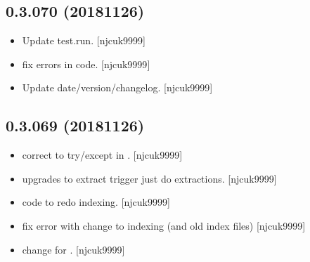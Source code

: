 \documentclass[a4paper,10pt,english]{report}
\begin{document}
\subsection{0.3.070 (2018\sphinxhyphen{}11\sphinxhyphen{}26)}
\label{\detokenize{misc/changelog:id272}}\begin{itemize}
\item {} 
Update test.run. {[}njcuk9999{]}

\item {} 
 \sphinxhyphen{} fix errors in code. {[}njcuk9999{]}

\item {} 
Update date/version/changelog. {[}njcuk9999{]}

\end{itemize}


\subsection{0.3.069 (2018\sphinxhyphen{}11\sphinxhyphen{}26)}
\label{\detokenize{misc/changelog:id273}}\begin{itemize}
\item {} 
 \sphinxhyphen{} correct to try/except in .
{[}njcuk9999{]}

\item {} 
 \sphinxhyphen{} upgrades to extract trigger just do extractions.
{[}njcuk9999{]}

\item {} 
 \sphinxhyphen{} code to redo indexing. {[}njcuk9999{]}

\item {} 
 \sphinxhyphen{} fix error with change to indexing (and old index
files) {[}njcuk9999{]}

\item {} 
 \sphinxhyphen{} change  for .
{[}njcuk9999{]}

\end{itemize}
\end{document}
